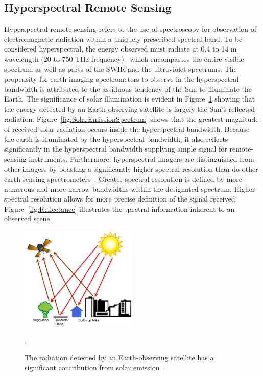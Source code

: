 \subsection{Hyperspectral Remote Sensing}
\label{sec:HSI}
Hyperspectral remote sensing refers to the use of spectroscopy for observation of electromagnetic radiation within a uniquely-prescribed spectral band. To be considered hyperspectral, the energy observed must radiate at 0.4 to 14 \textmu m wavelength (20 to 750 THz frequency)~\cite{Sue} which encompasses the entire visible spectrum as well as parts of the \ac{SWIR} and the ultraviolet spectrums. The propensity for earth-imaging spectrometers to observe in the hyperspectral bandwidth is attributed to the assiduous tendency of the Sun to illuminate the Earth. The significance of solar illumination is evident in Figure~\ref{fig:RemoteSensing} showing that the energy detected by an Earth-observing satellite is largely the Sun's reflected radiation. Figure~\ref{fig:SolarEmissionSpectrum} shows that the greatest magnitude of received solar radiation occurs inside the hyperspectral bandwidth. Because the earth is illuminated by the hyperspectral bandwidth, it also reflects significantly in the hyperspectral bandwidth supplying ample signal for remote-sensing instruments. Furthermore, hyperspectral imagers are distinguished from other imagers by boasting a significantly higher spectral resolution than do other earth-sensing spectrometers~\cite{Shippert}. Greater spectral resolution is defined by more numerous and more narrow bandwidths within the designated spectrum. Higher spectral resolution allows for more precise definition of the signal received. Figure~\ref{fig:Reflectance} illustrates the spectral information inherent to an observed scene.


\begin{figure}[htb]		%
\centering
\includegraphics[width=0.5\textwidth]{images/chap1/RemoteSensing}
\caption{The radiation detected by an Earth-observing satellite has a significant contribution from solar emission~\cite{RemoteSensing}.}.
\label{fig:RemoteSensing}
\end{figure}


